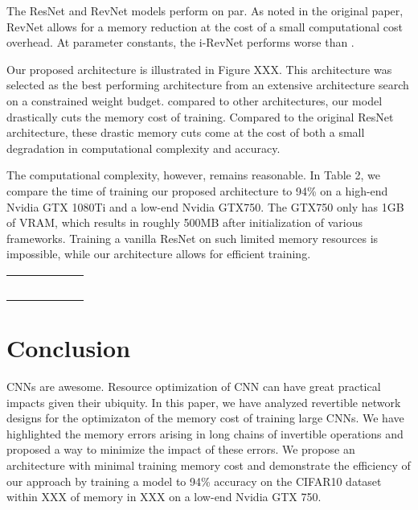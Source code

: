 \documentclass[twocolumn]{bmcart}
\begin{document}
The ResNet and RevNet models perform on par.
As noted in the original paper, RevNet allows for a memory reduction at the cost of
a small computational cost overhead.
At parameter constants, the i-RevNet performs worse than .

Our proposed architecture is illustrated in Figure XXX.
This architecture was selected as the best performing architecture 
from an extensive architecture search on a constrained weight budget. 
compared to other architectures, our model drastically cuts the memory cost of training.
Compared to the original ResNet architecture, these drastic memory cuts come at the cost of 
both a small degradation in computational complexity and accuracy.

The computational complexity, however, remains reasonable. 
In Table 2, we compare the time of training our proposed architecture to 94\% on a high-end Nvidia GTX 1080Ti and a low-end
Nvidia GTX750.
The GTX750 only has 1GB of VRAM, which results in roughly 500MB after initialization of various frameworks.
Training a vanilla ResNet on such limited memory resources is impossible, while our architecture allows for efficient training. 

\begin{table}[t]
\begin{tabular}{ c c c | c c c}	
 &  &  &  &  & \\
 &  &  &  &  & \\
\hline			
 &  &  &  &  & \\
 &  &  &  &  & \\
 &  &  &  &  & \\
\hline
\end{tabular}
\end{table}

\section{Conclusion}

CNNs are awesome.
Resource optimization of CNN can have great practical impacts given their ubiquity.
In this paper, we have analyzed revertible network designs for the optimizaton of the memory cost of training large CNNs.
We have highlighted the memory errors arising in long chains of invertible operations and proposed a way to minimize the impact of these errors.
We propose an architecture with minimal training memory cost and demonstrate the efficiency 
of our approach by training a model to 94\% accuracy on the CIFAR10 dataset within XXX of memory in XXX on a low-end Nvidia GTX 750.
\end{document}
